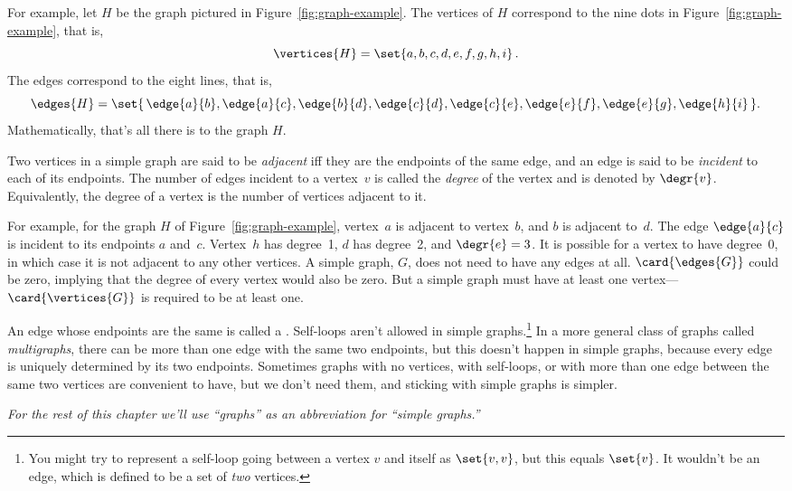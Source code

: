For example, let $H$ be the graph pictured in
Figure~\ref{fig:graph-example}.  The vertices of $H$ correspond to the
nine dots in Figure~\ref{fig:graph-example}, that is,
\[
\vertices{H} =  \set{a, b, c, d, e, f, g, h, i}\, .
\]
The edges correspond to the eight lines, that is,
\[
\edges{H} =  \set{\, \edge{a}{b}, \edge{a}{c}, \edge{b}{d}, \edge{c}{d},
              \edge{c}{e}, \edge{e}{f}, \edge{e}{g}, \edge{h}{i} \,}.
\]
Mathematically, that's all there is to the graph $H$.

\begin{definition}
Two vertices in a simple graph are said to be \emph{adjacent} iff they
are the endpoints of the same edge, and an edge is said to be
\emph{incident} to each of its endpoints.  The number of edges
incident to a vertex~$v$ is called the \emph{degree}%
of the vertex and
is denoted by $\degr{v}$.  Equivalently, the degree of a vertex is the
number of vertices adjacent to it.
\end{definition}

For example, for the graph $H$ of Figure~\ref{fig:graph-example},
vertex~$a$ is adjacent to vertex~$b$, and $b$ is adjacent to~$d$.  The
edge $\edge{a}{c}$ is incident to its endpoints $a$ and~$c$.
Vertex~$h$ has degree~1, $d$ has degree~2, and $\degr{e} = 3$.  It is
possible for a vertex to have degree~0, in which case it is not
adjacent to any other vertices.  A simple graph, $G$, does not need to
have any edges at all. $\card{\edges{G}}$ could be zero, implying that
the degree of every vertex would also be zero.  But a simple graph
must have at least one vertex---$\card{\vertices{G}}$ is
required to be at least one.

An edge whose endpoints are the same is called a \emph{}.
Self-loops aren't allowed in simple graphs.\footnote{You might try to
  represent a self-loop going between a vertex $v$ and itself as
  $\set{v, v}$, but this equals $\set{v}$. It wouldn't be an edge,
  which is defined to be a set of \emph{two} vertices.}  In a more
general class of graphs called \emph{multigraphs}, there can be more
than one edge with the same two endpoints, but this doesn't happen in
simple graphs, because every edge is uniquely determined by its two
endpoints.  Sometimes graphs with no vertices, with self-loops, or with more than one
edge between the same two vertices are convenient to have, but we don't
need them, and sticking with simple graphs is simpler.

\emph{For the rest of this chapter we'll use ``graphs'' as an abbreviation
  for ``simple graphs.''}


